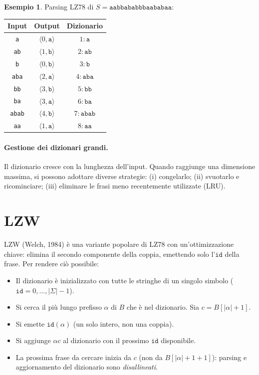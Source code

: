 \documentclass[12pt, a4paper, oneside]{book}
\theoremstyle{plain}
\theoremstyle{definition}
\newtheorem{esempio}[teorema]{Esempio}
\theoremstyle{remark}
\begin{document}
\begin{esempio}
Parsing LZ78 di $S = \texttt{aabbababbbaababaa}$:

\medskip
\begin{tabular}{ccc}
Input & Output & Dizionario \\
\hline
\texttt{a} & $\langle 0, \texttt{a} \rangle$ & $1: \texttt{a}$ \\
\texttt{ab} & $\langle 1, \texttt{b} \rangle$ & $2: \texttt{ab}$ \\
\texttt{b} & $\langle 0, \texttt{b} \rangle$ & $3: \texttt{b}$ \\
\texttt{aba} & $\langle 2, \texttt{a} \rangle$ & $4: \texttt{aba}$ \\
\texttt{bb} & $\langle 3, \texttt{b} \rangle$ & $5: \texttt{bb}$ \\
\texttt{ba} & $\langle 3, \texttt{a} \rangle$ & $6: \texttt{ba}$ \\
\texttt{abab} & $\langle 4, \texttt{b} \rangle$ & $7: \texttt{abab}$ \\
\texttt{aa} & $\langle 1, \texttt{a} \rangle$ & $8: \texttt{aa}$ \\
\end{tabular}
\end{esempio}

\paragraph{Gestione dei dizionari grandi.}
Il dizionario cresce con la lunghezza dell'input. Quando raggiunge una dimensione massima, si possono adottare diverse strategie: (i) congelarlo; (ii) svuotarlo e ricominciare; (iii) eliminare le frasi meno recentemente utilizzate (LRU).

\section{LZW}
\label{sec:lzw}

LZW (Welch, 1984) è una variante popolare di LZ78 con un'ottimizzazione chiave: elimina il secondo componente della coppia, emettendo solo l'$\mathtt{id}$ della frase. Per rendere ciò possibile:

\begin{itemize}
  \item Il dizionario è inizializzato con tutte le stringhe di un singolo simbolo ($\mathtt{id} = 0, \ldots, |\Sigma| - 1$).
  \item Si cerca il più lungo prefisso $\alpha$ di $B$ che è nel dizionario. Sia $c = B[|\alpha| + 1]$.
  \item Si emette $\mathtt{id}(\alpha)$ (un solo intero, non una coppia).
  \item Si aggiunge $\alpha c$ al dizionario con il prossimo $\mathtt{id}$ disponibile.
  \item La prossima frase da cercare inizia da $c$ (non da $B[|\alpha| + 1 + 1]$): parsing e aggiornamento del dizionario sono \emph{disallineati}.
\end{itemize}
\end{document}
